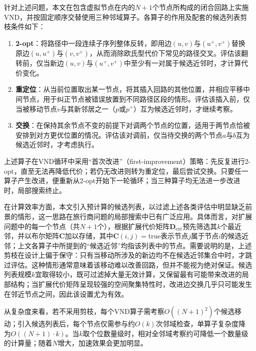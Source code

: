 \documentclass[lettersize,journal]{IEEEtran}
\begin{document}
针对上述问题，本文在包含虚拟节点在内的$N+1$个节点所构成的闭合回路上实施VND，并按固定顺序交替使用三种邻域算子。各算子的作用及配套的候选列表剪枝条件如下：
\begin{enumerate}
\item \textbf{2-opt}：将路径中一段连续子序列整体反转，即用边$(u, v)$与$(u^{+}, v^{+})$替换原边$(u, u^{+})$与$(v, v^{+})$，从而消除欧氏型代价下常见的路径交叉。评估该翻转前，仅当新边$(u, v)$与$(u^{+}, v^{+})$中至少有一对属于候选近邻时，才计算代价变化。
\item \textbf{重定位}：从当前位置取出某一节点，将其插入回路的其他位置，并相应平移中间节点，用于纠正节点被错误放置到不同路径区段的情形。评估该插入前，仅当被移动节点$v$与其新邻居之一（$p$或$p^{+}$）互为候选近邻时，才继续考察。
\item \textbf{交换}：在保持其余节点不变的前提下对调两个节点的位置，适用于两节点恰被安排到对方更优位置的情况。评估该对调前，仅当待交换的两个节点$a$与$b$互为候选近邻时，才考虑执行。
\end{enumerate}
上述算子在VND循环中采用“首次改进”（first-improvement）策略：先反复进行2-opt，直至无法再降低代价；若仍无改进则转为重定位，最后尝试交换。只要任一算子产生改进，便重新从2-opt开始下一轮循环；当三种算子均无法进一步改进时，局部搜索终止。

在计算效率方面，本文引入预计算的候选列表，以过滤上述各类评估中明显缺乏前景的情形，这一思路在旅行商问题的局部搜索中已有广泛应用\textcolor{blue}{\cite{ref26}}。具体而言，对扩展问题中的每一个节点（共$N+1$个），根据扩展代价矩阵$\mathbf{D}_{\mathrm{ext}}$预先筛选其$k$个最近邻，并以布尔矩阵$\mathbf{C}$加以存储，其中$\mathbf{C}(i,j)=\mathrm{true}$表示节点$j$属于节点$i$的候选近邻；上文各算子中所提到的“候选近邻”均指该列表中的节点。需要说明的是，上述剪枝在设计上偏于保守：只有当移动所涉及的新边均不在候选近邻集合中时，才跳过评估。这种情形通常意味着该移动难以改善回路，但并不能视为绝对保证。候选列表规模$k$宜取得较小，既可过滤掉大量无效计算，又保留最有可能带来改进的局部结构；当扩展代价矩阵呈现较强的空间聚集特性时，改进边交换几乎只可能发生在邻近节点之间，因此该设置尤为有效。

从复杂度来看，若不采用剪枝，每个VND算子需考察$O((N+1)^2)$个候选移动；引入候选列表后，每个节点仅需参与约$O(k)$次邻域检查，单算子复杂度降为$O((N+1)\cdot k)$。当$k$取个位数量级时，相对全邻域考察约可降低一个数量级的计算量；随着$N$增大，加速效果会更加明显。
\end{document}
